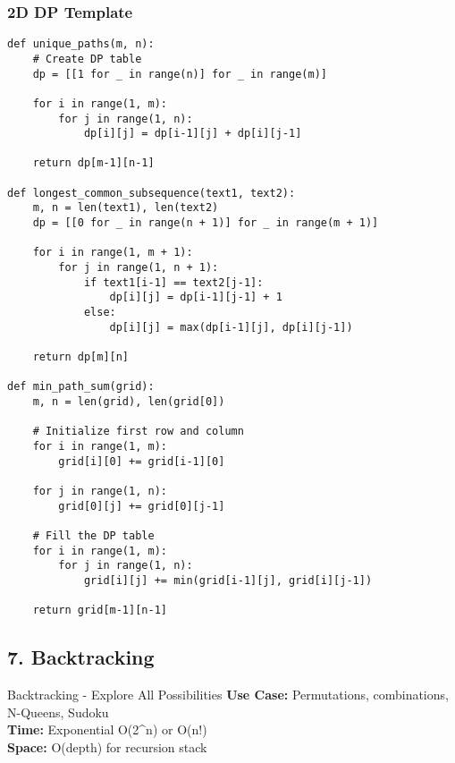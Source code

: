 \documentclass[10pt,a4paper]{article}
\begin{document}
\subsubsection{2D DP Template}
\begin{lstlisting}
def unique_paths(m, n):
    # Create DP table
    dp = [[1 for _ in range(n)] for _ in range(m)]

    for i in range(1, m):
        for j in range(1, n):
            dp[i][j] = dp[i-1][j] + dp[i][j-1]

    return dp[m-1][n-1]

def longest_common_subsequence(text1, text2):
    m, n = len(text1), len(text2)
    dp = [[0 for _ in range(n + 1)] for _ in range(m + 1)]

    for i in range(1, m + 1):
        for j in range(1, n + 1):
            if text1[i-1] == text2[j-1]:
                dp[i][j] = dp[i-1][j-1] + 1
            else:
                dp[i][j] = max(dp[i-1][j], dp[i][j-1])

    return dp[m][n]

def min_path_sum(grid):
    m, n = len(grid), len(grid[0])

    # Initialize first row and column
    for i in range(1, m):
        grid[i][0] += grid[i-1][0]

    for j in range(1, n):
        grid[0][j] += grid[0][j-1]

    # Fill the DP table
    for i in range(1, m):
        for j in range(1, n):
            grid[i][j] += min(grid[i-1][j], grid[i][j-1])

    return grid[m-1][n-1]
\end{lstlisting}

\subsection{7. Backtracking}

\begin{patternbox}{Backtracking - Explore All Possibilities}
\textbf{Use Case:} Permutations, combinations, N-Queens, Sudoku\\
\textbf{Time:} Exponential O(2^n) or O(n!)\\
\textbf{Space:} O(depth) for recursion stack
\end{patternbox}
\end{document}
